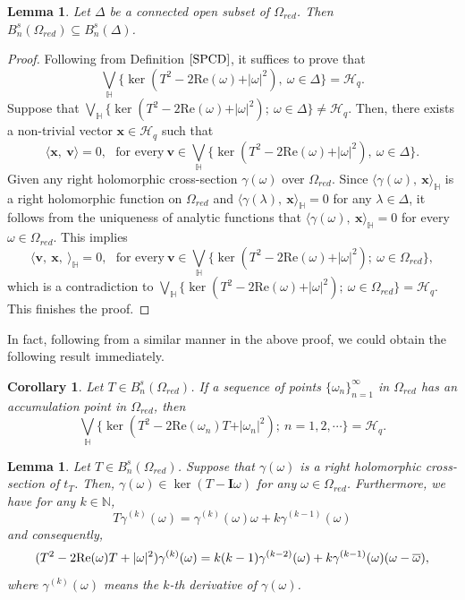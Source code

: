 \documentclass[pdflatex,sn-mathphys-num]{sn-jnl}%
\theoremstyle{thmstyleone}%
\theoremstyle{thmstyletwo}%
\newtheorem{corollary}{Corollary}%
\theoremstyle{thmstylethree}%
\newtheorem{lemma}{Lemma}%
\newtheorem{lemma}[theorem]{Lemma}
\newtheorem{corollary}[theorem]{Corollary}
\theoremstyle{definition}
\theoremstyle{remark}
\begin{document}
\begin{lemma}\label{CDP}
Let $\Delta$ be a connected open subset of
$\Omega_{red}$. Then $B_n^{s}(\Omega_{red})\subseteq B_n^{s}(\Delta)$.
\end{lemma}
    \begin{proof}
	Following from Definition $\ref{SPCD}$, it suffices to prove that
\[
\bigvee_{\mathbb{H}}\{\ker(T^2-2\mathrm{Re}(\omega)+\vert\omega\vert^2),\ \omega\in\Delta\}=\mathcal{H}_q.
\]
Suppose that $\bigvee_{\mathbb{H}}\{\ker(T^2-2\mathrm{Re}(\omega)+\vert\omega\vert^2);\ \omega\in\Delta\}\ne\mathcal{H}_q$. Then, there exists
a non-trivial vector $\boldsymbol{x}\in\mathcal{H}_q$ such that
\[
\langle\boldsymbol{x},\ \boldsymbol{v}\rangle=0, \ \ \ \text{for every} \ \boldsymbol{v}\in \bigvee_{\mathbb{H}}\{\ker(T^2-2\mathrm{Re}(\omega)+\vert\omega\vert^2),\ \omega\in\Delta\}.
\]
Given any right holomorphic cross-section $\gamma(\omega)$ over $\Omega_{red}$. Since $\langle\gamma(\omega),\ \boldsymbol{x}\rangle_{\mathbb{H}}$ is a right holomorphic function on $\Omega_{red}$ and $\langle\gamma(\lambda),\ \boldsymbol{x}\rangle_{\mathbb{H}}=0$ for any $\lambda\in\Delta$, it follows from the uniqueness of analytic functions that
$\langle\gamma(\omega),\ \boldsymbol{x}\rangle_{\mathbb{H}}=0$
for every $\omega\in\Omega_{red}$. This implies
\[
\langle\boldsymbol{v},\ \boldsymbol{x},\ \rangle_{\mathbb{H}}=0, \ \ \ \text{for every} \ \boldsymbol{v}\in \bigvee_{\mathbb{H}}\{\ker(T^2-2\mathrm{Re}(\omega)+\vert\omega\vert^2);\ \omega\in\Omega_{red}\},
\]
which is a contradiction to $\bigvee_{\mathbb{H}}\{\ker(T^2-2\mathrm{Re}(\omega)+\vert\omega\vert^2);\ \omega\in\Omega_{red}\}=\mathcal{H}_q$. This finishes the proof.
    \end{proof}

In fact, following from a similar  manner in the above proof, we could obtain the following result immediately.
\begin{corollary}
Let $T\in B_n^{s}(\Omega_{red})$. If a sequence of points $\{\omega_n\}_{n=1}^{\infty}$ in $\Omega_{red}$ has an accumulation point in $\Omega_{red}$,
then
\[
\bigvee_{\mathbb{H}}\{\ker(T^2-2\mathrm{Re}(\omega_n)T+\vert\omega_n\vert^2);\ n=1, 2,  \cdots\}=\mathcal{H}_q.
\]
\end{corollary}


\begin{lemma}\label{orthonormal basis P}
Let $T\in B_n^{s}(\Omega_{red})$. Suppose that $\gamma(\omega)$ is a right holomorphic cross-section of $t_T$.
Then, $\gamma(\omega)\in\ker(T-\boldsymbol{I}\omega)$ for any $\omega\in\Omega_{red}$. Furthermore, we have for any $k\in\mathbb{N}$,
\[
T\gamma^{(k)}(\omega)=\gamma^{(k)}(\omega)\omega+k\gamma^{(k-1)}(\omega)
\]
and consequently,
\begin{equation*}\label{nd}
(T^2-2\mathrm{Re}(\omega)T+\vert\omega\vert^2)\gamma^{(k)}(\omega) \\
=k(k-1)\gamma^{(k-2)}(\omega)+k\gamma^{(k-1)}(\omega)(\omega-\overline{\omega}),
\end{equation*}
where $\gamma^{(k)}(\omega)$ means the $k$-th derivative of $\gamma(\omega)$.
\end{lemma}
\end{document}
